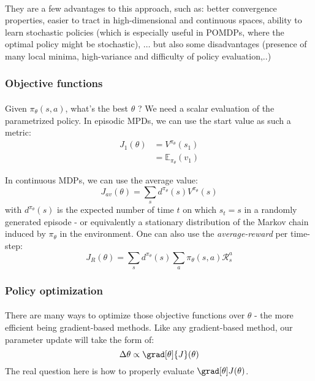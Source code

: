 {{{{			\paragraph{} They are a few advantages to this approach, such as: better convergence properties, easier to tract in high-dimensional and continuous spaces, ability to learn stochastic policies (which is especially useful in POMDPs, where the optimal policy might be stochastic), $\hdots$ but also some disadvantages (presence of many local minima, high-variance and difficulty of policy evaluation,..)
				}
				\subsubsection{Objective functions}
				{
				\paragraph{} Given $\pi_\theta(s,a)$, what's the best $\theta$ ? We need a scalar evaluation of the parametrized policy. In episodic MPDs, we can use the start value as such a metric:
				\begin{equation}
					\begin{aligned}
						J_1(\theta) &= V^{\pi_\theta}(s_1)\\
								  &= \mathbb{E}_{\pi_\theta}(v_1)
					\end{aligned}
				\end{equation}
				
				In continuous MDPs, we can use the average value: 
				\begin{equation}
					J_{av}(\theta) = \sum_s d^{\pi_\theta}(s) V^{\pi_{\theta}}(s)
				\end{equation}
				with $d^{\pi_\theta}(s)$ is the expected number of time $t$ on which $s_t=s$ in a randomly generated episode - or equivalently a stationary distribution of the Markov chain induced by $\pi_\theta$ in the environment. 
				One can also use the \emph{average-reward} per time-step:
				\begin{equation}
					J_R(\theta) = \sum_s d^{\pi_\theta}(s) \sum_{a} \pi_\theta(s,a) \mathcal{R}_s^a
				\end{equation}
				}
				
				\subsubsection{Policy optimization}
				{
				\paragraph{} There are many ways to optimize those objective functions over $\theta$ - the more efficient being gradient-based methods. 
				Like any gradient-based method, our parameter update will take the form of: 
				\begin{equation}
					\Delta \theta \propto \grad[\theta]{J}(\theta)
				\end{equation}
				The real question here is how to properly evaluate $\grad[\theta]J(\theta)$. 
				
}}}}
